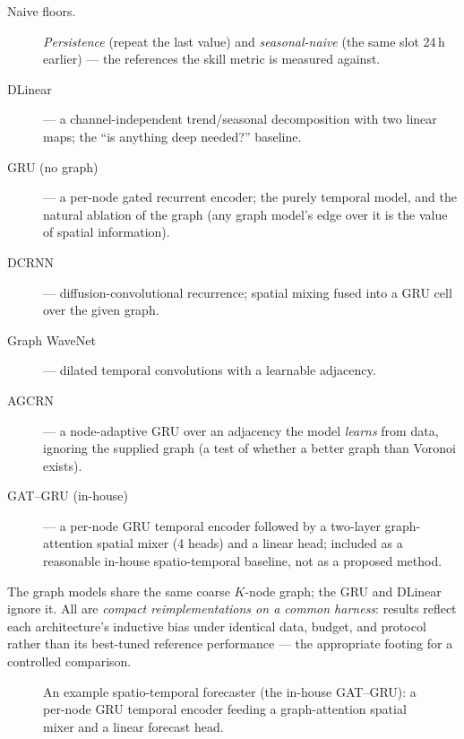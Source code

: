 \begin{description}
  \item[Naive floors.] \emph{Persistence} (repeat the last value) and \emph{seasonal-naive} (the same
  slot 24\,h earlier) --- the references the skill metric is measured against.
  \item[DLinear] \cite{zeng2023dlinear} --- a channel-independent trend/seasonal decomposition with two
  linear maps; the ``is anything deep needed?'' baseline.
  \item[GRU (no graph)] --- a per-node gated recurrent encoder; the purely temporal model, and the
  natural ablation of the graph (any graph model's edge over it is the value of spatial information).
  \item[DCRNN] \cite{li2018dcrnn} --- diffusion-convolutional recurrence; spatial mixing fused into a
  GRU cell over the given graph.
  \item[Graph WaveNet] \cite{wu2019gwn} --- dilated temporal convolutions with a learnable adjacency.
  \item[AGCRN] \cite{bai2020agcrn} --- a node-adaptive GRU over an adjacency the model \emph{learns}
  from data, ignoring the supplied graph (a test of whether a better graph than Voronoi exists).
  \item[GAT--GRU (in-house)] --- a per-node GRU temporal encoder followed by a two-layer graph-attention
  spatial mixer (4 heads) and a linear head; included as a reasonable in-house spatio-temporal
  baseline, not as a proposed method.
\end{description}

The graph models share the same coarse $K$-node graph; the GRU and DLinear ignore it. All are
\emph{compact reimplementations on a common harness}: results reflect each architecture's inductive
bias under identical data, budget, and protocol rather than its best-tuned reference performance ---
the appropriate footing for a controlled comparison.

\begin{figure}[t]
\caption{An example spatio-temporal forecaster (the in-house GAT--GRU): a per-node GRU temporal
encoder feeding a graph-attention spatial mixer and a linear forecast head.}
\label{fig:fc-arch}
\end{figure}

